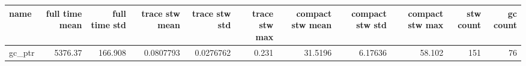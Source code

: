 \begin{tabular}{lrrrrrrrrrr}
\hline
 name   &   full time mean &   full time std &   trace stw mean &   trace stw std &   trace stw max &   compact stw mean &   compact stw std &   compact stw max &   stw count &   gc count \\
\hline
 gc\_ptr &          5376.37 &         166.908 &        0.0807793 &       0.0276762 &           0.231 &            31.5196 &           6.17636 &            58.102 &         151 &         76 \\
\hline
\end{tabular}